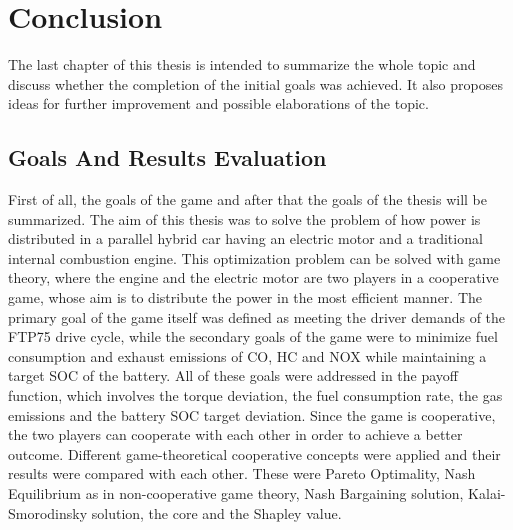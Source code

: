 \chapter{Conclusion}
\label{chp:conclusion}

The last chapter of this thesis is intended to summarize the whole topic and discuss whether the completion of the initial goals was achieved. It also proposes ideas for further improvement and possible elaborations of the topic.

\section{Goals And Results Evaluation}
First of all, the goals of the game and after that the goals of the thesis will be summarized. The aim of this thesis was to solve the problem of how power is distributed in a parallel hybrid car having an electric motor and a traditional internal combustion engine. This optimization problem can be solved with game theory, where the engine and the electric motor are two players in a cooperative game, whose aim is to distribute the power in the most efficient manner. The primary goal of the game itself was defined as meeting the driver demands of the FTP75 drive cycle, while the secondary goals of the game were to minimize fuel consumption and exhaust emissions of CO, HC and NOX while maintaining a target SOC of the battery. All of these goals were addressed in the payoff function, which involves the torque deviation, the fuel consumption rate, the gas emissions and the battery SOC target deviation. Since the game is cooperative, the two players can cooperate with each other in order to achieve a better outcome. Different game-theoretical cooperative concepts were applied and their results were compared with each other. These were Pareto Optimality, Nash Equilibrium as in non-cooperative game theory, Nash Bargaining solution, Kalai-Smorodinsky solution, the core and the Shapley value. 

